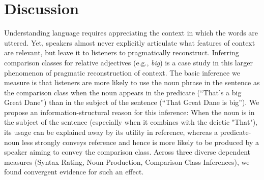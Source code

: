 \documentclass[10pt,letterpaper]{article}
\begin{document}
\section{Discussion}
Understanding language requires appreciating the context in which the words are uttered.
Yet, speakers almost never explicitly articulate what features of context are relevant, but leave it to listeners to pragmatically reconstruct. 
Inferring comparison classes for relative adjectives (e.g., \emph{big}) is a case study in this larger phenomenon of pragmatic reconstruction of context.
The basic inference we measure is that listeners are more likely to use the noun phrase in the sentence as the comparison class when the noun appears in the predicate (``That's a big Great Dane'') than in the subject of the sentence (``That Great Dane is big''). We propose an information-structural reason for this inference: When the noun is in the subject of the sentence (especially when it combines with the deictic "That"), its usage can be explained away by its utility in reference, whereas a predicate-noun less strongly conveys reference and hence is more likely to be produced by a speaker aiming to convey the comparison class. Across three diverse dependent measures (Syntax Rating, Noun Production, Comparison Class Inferences), we found convergent evidence for such an effect. 
\end{document}
